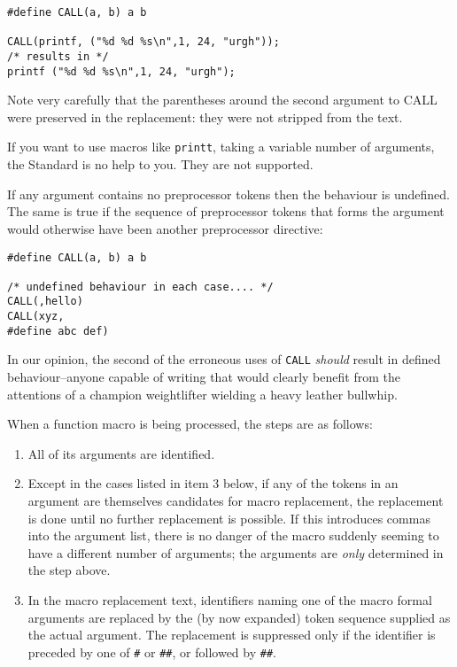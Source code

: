     \begin{Verbatim}
#define CALL(a, b) a b

CALL(printf, ("%d %d %s\n",1, 24, "urgh"));
/* results in */
printf ("%d %d %s\n",1, 24, "urgh");
\end{Verbatim}

    Note very carefully that the parentheses around the second argument
     to CALL were preserved in the replacement: they were not stripped from
     the text.


    If you want to use macros like \texttt{printt}, taking a variable
     number of arguments, the Standard is no help to you. They are not
     supported.


    If any argument contains no preprocessor tokens then the behaviour is
     undefined. The same is true if the sequence of preprocessor tokens that
     forms the argument would otherwise have been another preprocessor
     directive:


    \begin{Verbatim}
#define CALL(a, b) a b

/* undefined behaviour in each case.... */
CALL(,hello)
CALL(xyz,
#define abc def)
\end{Verbatim}

    In our opinion, the second of the erroneous uses of \texttt{CALL}
     \textit{should} result in defined behaviour--anyone capable of
     writing that would clearly benefit from the attentions of a champion
     weightlifter wielding a heavy leather bullwhip.


    When a function macro is being processed, the steps are as
     follows:


    \begin{enumerate}
     \item All of its arguments are identified.

     \item Except in the cases listed in item 3 below, if any of the tokens in
      an argument are themselves candidates for macro replacement, the
      replacement is done until no further replacement is possible. If
      this introduces commas into the argument list, there is no danger
      of the macro suddenly seeming to have a different number of
      arguments; the arguments are \textit{only} determined in the step
      above.

     \item In the macro replacement text, identifiers naming one of the macro
      formal arguments are replaced by the (by now expanded) token
      sequence supplied as the actual argument. The replacement is
      suppressed only if the identifier is preceded by one
      of \texttt{\#} or \texttt{\#\#}, or followed
      by \texttt{\#\#}.
    \end{enumerate}

